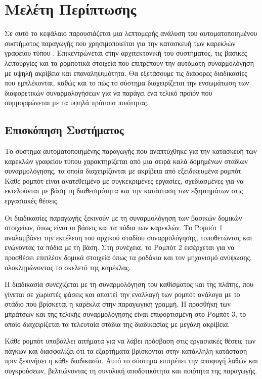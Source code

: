 \chapter{Μελέτη Περίπτωσης}\label{ch:case_study}
Σε αυτό το κεφάλαιο παρουσιάζεται μια λεπτομερής ανάλυση του αυτοματοποιημένου συστήματος παραγωγής που χρησιμοποιείται για την κατασκευή των καρεκλών γραφείου τύπου . Επικεντρώνεται στην αρχιτεκτονική του συστήματος, τις βασικές λειτουργίες και τα ρομποτικά στοιχεία που επιτρέπουν την αυτόματη συναρμολόγηση με υψηλή ακρίβεια και επαναληψιμότητα. Θα εξετάσουμε τις διάφορες διαδικασίες που εμπλέκονται, καθώς και το πώς το σύστημα διαχειρίζεται την ενσωμάτωση των διαφορετικών συναρμολογήσεων για να παράγει ένα τελικό προϊόν που συμμορφώνεται με τα υψηλά πρότυπα ποιότητας.

\section{Επισκόπηση Συστήματος}
\noindent Το σύστημα αυτοματοποιημένης παραγωγής που αναπτύχθηκε για την κατασκευή των καρεκλών γραφείου τύπου  χαρακτηρίζεται από μια σειρά καλά δομημένων σταδίων συναρμολόγησης, τα οποία διαχειρίζονται με ακρίβεια από εξειδικευμένα ρομπότ. Κάθε ρομπότ είναι ανατεθειμένο με συγκεκριμένες εργασίες, σχεδιασμένες για να εκτελούνται με βάση τη διαθεσιμότητα και την κατάσταση των εξαρτημάτων στις εργασιακές θέσεις.

Οι διαδικασίες παραγωγής ξεκινούν με τη συναρμολόγηση των βασικών δομικών στοιχείων, όπως είναι οι βάσεις και τα πόδια των καρεκλών. Το Ρομπότ 1 αναλαμβάνει την εκτέλεση του αρχικού σταδίου συναρμολόγησης, τοποθετώντας και ενώνοντας τα πόδια με τη βάση. Στη συνέχεια, το Ρομπότ 2 εισέρχεται για να προσθέσει επιπλέον δομικά στοιχεία όπως τα ροδάκια και τον μηχανισμό ανύψωσης, ολοκληρώνοντας το σκελετό της καρέκλας.

Η διαδικασία συνεχίζεται με τη συναρμολόγηση του καθίσματος και της πλάτης, που γίνεται σε χωριστές φάσεις και απαιτεί την εναλλαγή των ρομπότ ανάλογα με το στάδιο που βρίσκεται η καρέκλα στην παραγωγική γραμμή. Η προσθήκη των μπράτσων και της τελικής συναρμολόγησης είναι επιφορτισμένη στο Ρομπότ 3, το οποίο διαχειρίζεται τα τελευταία στάδια της διαδικασίας με μεγάλη ακρίβεια.

Κάθε ρομπότ υποβάλλει αιτήματα για να λάβει πρόσβαση στις εργασιακές θέσεις των πάγκων και διασφαλίζει ότι τα εξαρτήματα βρίσκονται στην κατάλληλη κατάσταση πριν ξεκινήσει η κάθε διαδικασία. Αυτό το σύστημα επιτρέπει την αποφυγή λαθών και συγκρούσεων, βελτιώνοντας τη συνολική αποδοτικότητα και ποιότητα της παραγωγής.

